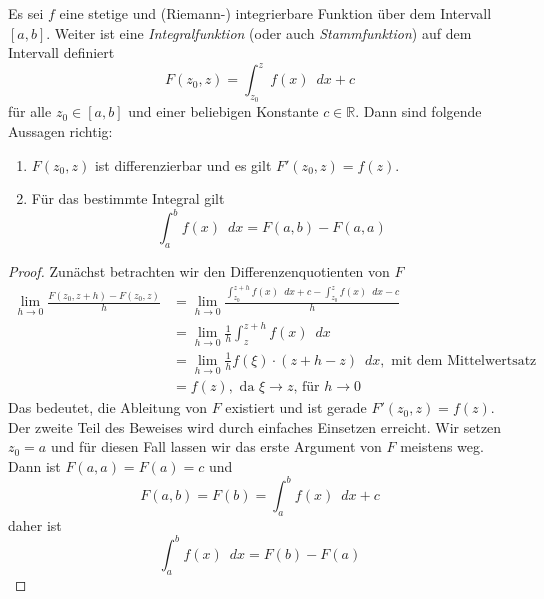 \begin{satz}
Es sei $f$ eine stetige und (Riemann-) integrierbare Funktion über dem Intervall $[a,b]$. Weiter ist eine \emph{Integralfunktion} (oder auch \emph{Stammfunktion}) auf dem Intervall definiert
\begin{equation}
F(z_0,z) = \int_{z_0}^z f(x) \enspace dx + c
\end{equation}
für alle $z_0 \in [a,b]$ und einer beliebigen Konstante $c\in \mathbb{R}$. Dann sind folgende Aussagen richtig:

\begin{enumerate}
\item $F(z_0,z)$ ist differenzierbar und es gilt $F'(z_0,z) = f(z)$.
\item Für das bestimmte Integral gilt \begin{equation}
\int_a^b f(x) \enspace dx = F(a,b)-F(a,a)
\end{equation}
\end{enumerate}
\end{satz}
\begin{proof}
Zunächst betrachten wir den Differenzenquotienten von $F$
\begin{equation}
\begin{split}
\lim_{h\rightarrow 0} \frac{F(z_0,z+h)-F(z_0,z)}{h} &= \lim_{h\rightarrow 0} \frac{\int_{z_0}^{z+h} f(x)\enspace dx+c - \int_{z_0}^{z} f(x)\enspace dx-c}{h} \\
&= \lim_{h\rightarrow 0}\frac{1}{h} \int_{z}^{z+h} f(x)\enspace dx \\
&= \lim_{h\rightarrow 0}\frac{1}{h} f(\xi)\cdot (z+h-z)\enspace dx, \text{ mit dem Mittelwertsatz} \\
&= f(z), \text{ da }\xi \rightarrow z\text{, für }h\rightarrow 0
\end{split}
\end{equation}
Das bedeutet, die Ableitung von $F$ existiert und ist gerade $F'(z_0,z)=f(z)$. Der zweite Teil des Beweises wird durch einfaches Einsetzen erreicht. Wir setzen $z_0 = a$ und für diesen Fall lassen wir das erste Argument von $F$ meistens weg. Dann ist $F(a,a)=F(a)=c$ und
\begin{equation*}
F(a,b)=F(b) = \int_a^b f(x) \enspace dx +c
\end{equation*}
daher ist
\begin{equation}
\int_a^b f(x) \enspace dx = F(b)-F(a)
\end{equation}
\end{proof}


